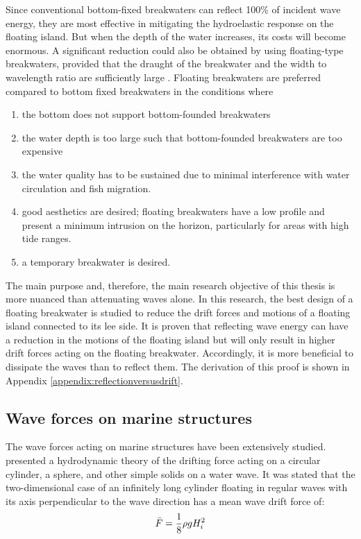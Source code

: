 Since conventional bottom-fixed breakwaters can reflect 100\% of incident wave energy, they are most effective in mitigating the hydroelastic response on the floating island. But when the depth of the water increases, its costs will become enormous. A significant reduction could also be obtained by using floating-type breakwaters, provided that the draught of the breakwater and the width to wavelength ratio are sufficiently large \citep{Wang2010}. Floating breakwaters are preferred compared to bottom fixed breakwaters in the conditions where
\begin{enumerate}
    \item the bottom does not support bottom-founded breakwaters
    \item the water depth is too large such that bottom-founded breakwaters are too expensive
    \item the water quality has to be sustained due to minimal interference with water circulation and fish migration.
    \item good aesthetics are desired; floating breakwaters have a low profile and present a minimum intrusion on the horizon, particularly for areas with high tide ranges.
    \item a temporary breakwater is desired. 
\end{enumerate}


The main purpose and, therefore, the main research objective of this thesis is more nuanced than attenuating waves alone. In this research, the best design of a floating breakwater is studied to reduce the drift forces and motions of a floating island connected to its lee side. It is proven that reflecting wave energy can have a reduction in the motions of the floating island but will only result in higher drift forces acting on the floating breakwater. Accordingly, it is more beneficial to dissipate the waves than to reflect them. The derivation of this proof is shown in Appendix \ref{appendix:reflectionversusdrift}.
\\


\subsection{Wave forces on marine structures}
The wave forces acting on marine structures have been extensively studied. \citep{Maruo1960} presented a hydrodynamic theory of the drifting force acting on a circular cylinder, a sphere, and other simple solids on a water wave. It was stated that the two-dimensional case of an infinitely long cylinder floating in regular waves with its axis perpendicular to the wave direction has a mean wave drift force of:
\begin{equation}
    \Bar{F} = \frac{1}{8}\rho g H_i^2
\end{equation}


